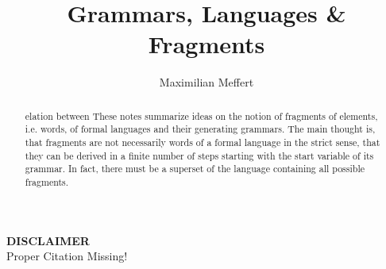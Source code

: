 \documentclass[runningheads,a4paper]{llncs}
\title{Grammars, Languages \& Fragments}
\author{Maximilian Meffert}
\institute{}
\begin{document}
\maketitle

\begin{center}
\textbf{DISCLAIMER}
\\Proper Citation Missing!
\end{center}

\begin{abstract}elation between
These notes summarize ideas on the notion of fragments of elements, i.e. words, of formal languages and their generating grammars.
The main thought is, that fragments are not necessarily words of a formal language in the strict sense, that they can be derived in a finite number of steps starting with the start variable of its grammar.
In fact, there must be a superset of the language containing all possible fragments.
\end{abstract}
\end{document}
